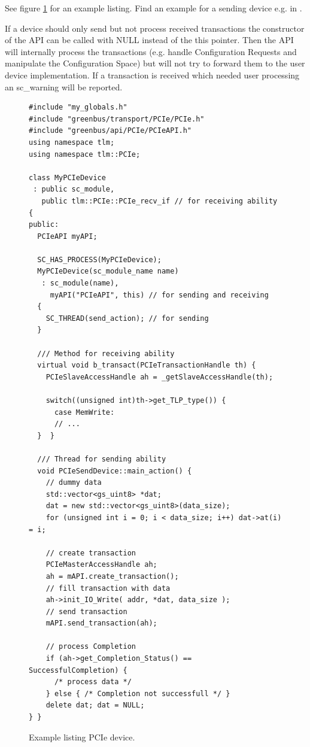See figure \ref{fig:ListPCIeDevice} for an example listing. Find an example for a sending device e.g. in \mbox{.}

If a device should only send but not process received transactions the constructor of the API can be called with NULL instead of the this pointer. Then the API will internally process the transactions (e.g. handle Configuration Requests and manipulate the Configuration Space) but will not try to forward them to the user device implementation. If a transaction is received which needed user processing an sc\_warning will be reported.

\begin{figure}[H]%
  \begin{lstlisting}
#include "my_globals.h"
#include "greenbus/transport/PCIe/PCIe.h"
#include "greenbus/api/PCIe/PCIeAPI.h"
using namespace tlm;
using namespace tlm::PCIe;

class MyPCIeDevice
 : public sc_module,
   public tlm::PCIe::PCIe_recv_if // for receiving ability {
public:
  PCIeAPI myAPI;

  SC_HAS_PROCESS(MyPCIeDevice);
  MyPCIeDevice(sc_module_name name)
   : sc_module(name),
     myAPI("PCIeAPI", this) // for sending and receiving
  {
    SC_THREAD(send_action); // for sending
  }
  
  /// Method for receiving ability
  virtual void b_transact(PCIeTransactionHandle th) {
    PCIeSlaveAccessHandle ah = _getSlaveAccessHandle(th);

    switch((unsigned int)th->get_TLP_type()) {
      case MemWrite:
      // ...
  }  }
  
  /// Thread for sending ability
  void PCIeSendDevice::main_action() {
    // dummy data
    std::vector<gs_uint8> *dat;
    dat = new std::vector<gs_uint8>(data_size);
    for (unsigned int i = 0; i < data_size; i++) dat->at(i) = i;

    // create transaction
    PCIeMasterAccessHandle ah;
    ah = mAPI.create_transaction();
    // fill transaction with data
    ah->init_IO_Write( addr, *dat, data_size );
    // send transaction
    mAPI.send_transaction(ah);

    // process Completion    
    if (ah->get_Completion_Status() == SuccessfulCompletion) {
      /* process data */
    } else { /* Completion not successfull */ }
    delete dat; dat = NULL;
} }
  \end{lstlisting}
  \caption{Example listing PCIe device.}
  \label{fig:ListPCIeDevice}
\end{figure}

